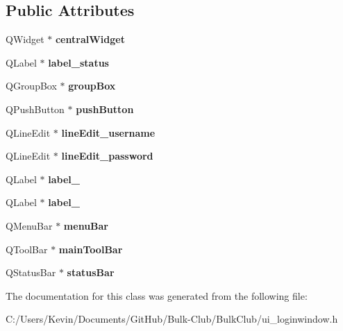 \subsection*{Public Attributes}
\begin{DoxyCompactItemize}
\item 
\mbox{\label{class_ui___login_window_a7ffc894fa4366745f649b11da293a0d0}} 
Q\+Widget $\ast$ {\bfseries central\+Widget}
\item 
\mbox{\label{class_ui___login_window_a3b7bc89f59e08b5d5cf7eb07c7823d4d}} 
Q\+Label $\ast$ {\bfseries label\+\_\+status}
\item 
\mbox{\label{class_ui___login_window_a03bcc8cd7e6c127020c4061b15e5b6d0}} 
Q\+Group\+Box $\ast$ {\bfseries group\+Box}
\item 
\mbox{\label{class_ui___login_window_acd9c736cb51f2eb6bb96b039a98dd4d4}} 
Q\+Push\+Button $\ast$ {\bfseries push\+Button}
\item 
\mbox{\label{class_ui___login_window_abafd1bca620296f189f9fe748f7cee7f}} 
Q\+Line\+Edit $\ast$ {\bfseries line\+Edit\+\_\+username}
\item 
\mbox{\label{class_ui___login_window_aee5ee7b7a8c0335ae5ddbbbdfd86643c}} 
Q\+Line\+Edit $\ast$ {\bfseries line\+Edit\+\_\+password}
\item 
\mbox{\label{class_ui___login_window_ac31fb3c5e9b841f0f8fc2e3fde172746}} 
Q\+Label $\ast$ {\bfseries label\+\_}
\item 
\mbox{\label{class_ui___login_window_ab5731531cfd38d77fbbe44e81e7c4ca5}} 
Q\+Label $\ast$ {\bfseries label\+\_}
\item 
\mbox{\label{class_ui___login_window_ad59432fc43a2528dba7f5adf5b4947a2}} 
Q\+Menu\+Bar $\ast$ {\bfseries menu\+Bar}
\item 
\mbox{\label{class_ui___login_window_a8880fd45ea5f8003f9ffb81b1a76cb23}} 
Q\+Tool\+Bar $\ast$ {\bfseries main\+Tool\+Bar}
\item 
\mbox{\label{class_ui___login_window_aeb52631f84ab20de4abdfa726211e3c9}} 
Q\+Status\+Bar $\ast$ {\bfseries status\+Bar}
\end{DoxyCompactItemize}


The documentation for this class was generated from the following file\+:\begin{DoxyCompactItemize}
\item 
C\+:/\+Users/\+Kevin/\+Documents/\+Git\+Hub/\+Bulk-\/\+Club/\+Bulk\+Club/ui\+\_\+loginwindow.\+h\end{DoxyCompactItemize}
